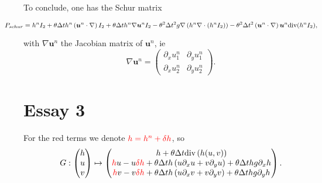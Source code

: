 \documentclass[a4paper, 11pt]{article}
\begin{document}
To conclude, one has the Schur matrix 
\begin{small}
\begin{equation*}
\hspace*{-1cm}P_{schur}=h^nI_2+\theta\Delta th^n\left(\boldsymbol{u}^n\cdot\nabla\right)I_2+\theta\Delta th^n\nabla\boldsymbol{u}^nI_2-\theta^2\Delta t^2g\nabla\left(h^n\nabla\cdot\left(h^nI_2\right)\right)-\theta^2\Delta t^2\left(\boldsymbol{u}^n\cdot\nabla\right)\boldsymbol{u}^n\text{div}(h^nI_2),
\end{equation*}
\end{small}
with $\nabla\boldsymbol{u}^n$ the Jacobian matrix of $\boldsymbol{u}^n$, ie
\begin{equation*}
\nabla\boldsymbol{u}^n=
\begin{pmatrix}
\partial_x u_1^n &\partial_y u_1^n\\ \partial_x u_2^n &\partial_y u_2^n
\end{pmatrix}.
\end{equation*}


\section{Essay 3}
For the red terms we denote $\textcolor{red}{h=h^n+\delta h}$, so
\begin{equation*}
G:\begin{pmatrix}h\\u\\v\end{pmatrix}\mapsto\begin{pmatrix}h+\theta\Delta t\text{div}\left(h(u,v)\right)\\
\textcolor{red}{h}u-u\textcolor{red}{\delta h}+\theta\Delta t h\left(u\partial_xu+v\partial_yu\right)+\theta \Delta thg\partial_x h\\
\textcolor{red}{h}v-v\textcolor{red}{\delta h}+\theta\Delta t h\left(u\partial_xv+v\partial_yv\right)+\theta \Delta thg\partial_y h
\end{pmatrix}.
\end{equation*}
\end{document}
